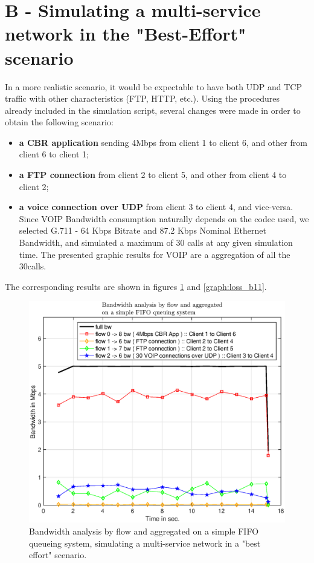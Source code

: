 \documentclass[conference,compsoc]{IEEEtran}
\begin{document}
     \section{B - Simulating a multi-service network in  the "Best-Effort" scenario}


     In a more realistic scenario, it would be expectable to have both UDP and TCP traffic with other characteristics (FTP, HTTP, etc.).
     Using the procedures already included in the simulation script, several changes were made in order to obtain the
     following scenario:
     \begin{itemize}
     \item \textbf{a CBR application} sending 4Mbps from client 1 to client 6, and other from client 6 to client 1;
     \item  \textbf{a FTP connection} from client 2 to client 5, and other from client 4 to client 2;
     \item  \textbf{a voice connection over UDP} from client 3 to client 4, and vice-versa. Since VOIP Bandwidth consumption naturally depends on the codec used, we selected G.711 - 64 Kbps Bitrate and 87.2 Kbps Nominal Ethernet Bandwidth, and simulated a maximum of 30 calls at any given simulation time. The presented graphic results for VOIP are a aggregation of all the 30calls. 
     \end{itemize}
     The corresponding results are shown in figures \ref{graph:bw_b1} and \ref{graph:loss_b11}.

     \begin{figure}[H]
     \centering
     \includegraphics[width=1\columnwidth]{EPS/B/bw_b1.eps}
     \caption{Bandwidth analysis by flow and aggregated on a simple FIFO queueing system, simulating a multi-service network in a "best effort" scenario.}
     \label{graph:bw_b1}
     \end{figure}
\end{document}

